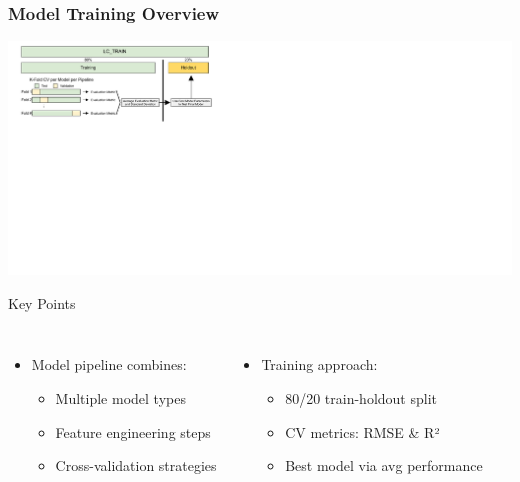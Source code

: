 \documentclass{beamer}
\begin{document}
\begin{frame}
\frametitle{Model Training Overview}
    \includegraphics[width=\textwidth]{images/modeling/model_building.pdf}
    
    \begin{alertblock}{Key Points}
        \begin{columns}[T,onlytextwidth]
            \begin{itemize}
            \item Model pipeline combines:
                \begin{itemize}
                \item Multiple model types
                \item Feature engineering steps
                \item Cross-validation strategies
                \end{itemize}
            \end{itemize}
            
            \begin{itemize}
            \item Training approach:
                \begin{itemize}
                \item 80/20 train-holdout split
                \item CV metrics: RMSE \& R²
                \item Best model via avg performance
                \end{itemize}
            \end{itemize}
        \end{columns}
    \end{alertblock}
\end{frame}
\end{document}
